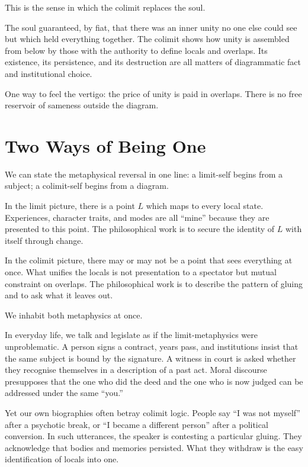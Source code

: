 \documentclass[12pt,a4paper]{article}
\begin{document}
This is the sense in which the colimit replaces the soul.

The soul guaranteed, by fiat, that there was an inner unity no one else could see but which held everything together. The colimit shows how unity is assembled from below by those with the authority to define locals and overlaps. Its existence, its persistence, and its destruction are all matters of diagrammatic fact and institutional choice.

One way to feel the vertigo: the price of unity is paid in overlaps. There is no free reservoir of sameness outside the diagram.

\section{Two Ways of Being One}

We can state the metaphysical reversal in one line: a limit-self begins from a subject; a colimit-self begins from a diagram.

In the limit picture, there is a point $L$ which maps to every local state. Experiences, character traits, and modes are all ``mine'' because they are presented to this point. The philosophical work is to secure the identity of $L$ with itself through change.

In the colimit picture, there may or may not be a point that sees everything at once. What unifies the locals is not presentation to a spectator but mutual constraint on overlaps. The philosophical work is to describe the pattern of gluing and to ask what it leaves out.

We inhabit both metaphysics at once.

In everyday life, we talk and legislate as if the limit-metaphysics were unproblematic. A person signs a contract, years pass, and institutions insist that the same subject is bound by the signature. A witness in court is asked whether they recognise themselves in a description of a past act. Moral discourse presupposes that the one who did the deed and the one who is now judged can be addressed under the same ``you.''

Yet our own biographies often betray colimit logic. People say ``I was not myself'' after a psychotic break, or ``I became a different person'' after a political conversion. In such utterances, the speaker is contesting a particular gluing. They acknowledge that bodies and memories persisted. What they withdraw is the easy identification of locals into one.
\end{document}
